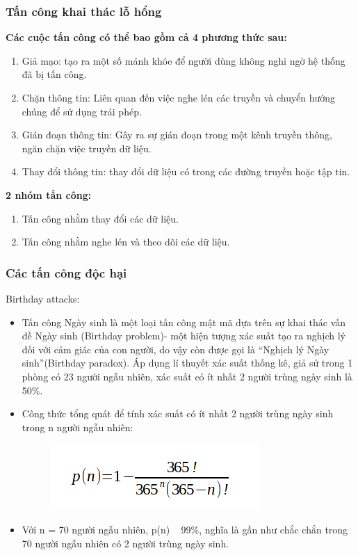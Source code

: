 \documentclass{beamer}
\begin{document}
\begin{frame}
\frametitle{Tấn công khai thác lỗ hổng}

\textbf{Các cuộc tấn công có thể bao gồm cả 4 phương thức sau:}
\begin{enumerate}
\item Giả mạo: tạo ra một số mánh khóe để người dùng không nghi ngờ hệ thống đã bị tấn công.
\item Chặn thông tin: Liên quan đến việc nghe lén các truyền và chuyển hướng chúng để sử dụng trái phép.
\item Gián đoạn thông tin: Gây ra sự gián đoạn trong một kênh truyền thông, ngăn chặn việc truyền dữ liệu.
\item Thay đổi thông tin: thay đổi dữ liệu có trong các đường truyền hoặc tập tin.
\end{enumerate}

\textbf{2 nhóm tấn công:}
\begin{enumerate}
\item Tấn công nhằm thay đổi các dữ liệu.
\item Tấn công nhằm nghe lén và theo dõi các dữ liệu.
\end{enumerate}
\end{frame}
\begin{frame}
\frametitle{Các tấn công độc hại}
    \begin{block}{Birthday attacks:}
         \begin{itemize}
    \item Tấn công Ngày sinh là một loại tấn công mật mã dựa trên sự khai thác vấn đề Ngày sinh (Birthday problem)- một hiện tượng xác suất tạo ra nghịch lý đối với cảm giác của con người, do vậy còn được gọi là “Nghịch lý Ngày sinh”(Birthday paradox). Áp dụng lí thuyết xác suất thống kê, giả sử trong 1 phòng có 23 người ngẫu nhiên, xác suất có ít nhất  2 người trùng ngày sinh là 50\%.
    \item Công thức tổng quát để tính xác suất có ít nhất 2 người trùng ngày sinh trong n người ngẫu nhiên:
    \begin{figure}[h]
    \centering\includegraphics[width=0.4\linewidth]{images/bday.png}
    \end{figure}
    \item Với n = 70 người ngẫu nhiên, p(n) ~ 99\%, nghĩa là gần như chắc chắn trong 70 người ngẫu nhiên có 2 người trùng ngày sinh.
\end{itemize}
    \end{block}
\end{frame}
\end{document}
